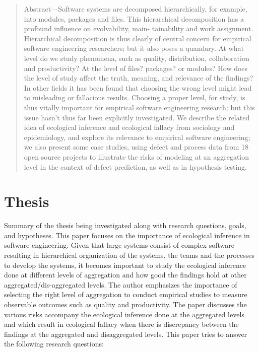 \documentclass[12pt]{article}
\begin{document}
\maketitle

\begin{abstract}
Abstract—Software systems are decomposed hierarchically, for
example, into modules, packages and files. This hierarchical
decomposition has a profound influence on evolvability, main-
tainability and work assignment. Hierarchical decomposition is
thus clearly of central concern for empirical software engineering
researchers; but it also poses a quandary. At what level do we
study phenomena, such as quality, distribution, collaboration and
productivity? At the level of files? packages? or modules? How
does the level of study affect the truth, meaning, and relevance
of the findings? In other fields it has been found that choosing
the wrong level might lead to misleading or fallacious results.
Choosing a proper level, for study, is thus vitally important for
empirical software engineering research; but this issue hasn’t
thus far been explicitly investigated. We describe the related idea
of ecological inference and ecological fallacy from sociology and
epidemiology, and explore its relevance to empirical software
engineering; we also present some case studies, using defect and
process data from 18 open source projects to illustrate the risks
of modeling at an aggregation level in the context of defect
prediction, as well as in hypothesis testing.
\end{abstract}

\section{Thesis}\label{thesis}
Summary of the thesis being investigated along with research questions, goals, and hypotheses.
This paper focuses on the importance of ecological inference in software engineering. Given that large systems consist of complex software
resulting in hierarchical organization of the systems, the teams and the processes to develop the systems, it becomes important to study the ecological inference
done at different levels of aggregation and how good the findings hold at other aggregated/dis-aggregated levels. The author emphasizes the importance of selecting the 
right level of aggregation to conduct empirical studies to measure observable outcomes such as quality and productivity. The paper discusses the various risks accompany the 
ecological inference done at the aggregated levels and which result in ecological fallacy when there is discrepancy between the findings at the aggregated and disaggregated levels.
This paper tries to answer the following research questions:
\end{document}
